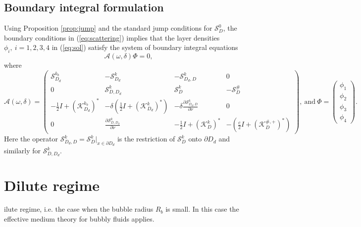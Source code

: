 \documentclass[a4paper]{article}
\theoremstyle{definition}
\newcommand{\A}{\mathcal{A}}
\renewcommand{\S}{\mathcal{S}}
\newcommand{\K}{\mathcal{K}}
\newcommand{\Scrystal}{\mathcal{S}_D^\#}
\newcommand{\eqnref}[1]{(\ref {#1})}
\begin{document}
\subsection{Boundary integral formulation}
Using Proposition \ref{prop:jump} and the standard jump conditions for $\S_D^0$, the boundary conditions in \eqnref{eq:scattering} implies that the layer densities $\phi_i,\ i=1,2,3,4$ in \eqnref{eq:sol} satisfy the system of boundary integral equations
\[\A(\omega, \delta)\Phi = 0,\] where
\begin{equation} \label{eq:A}
\A(\omega, \delta) = 
\begin{pmatrix}
\S_{D_d}^{k_b} &  -\S_{D_d}^{k} & -\S_{D_d,D}^{k} & 0 \\
0 & \S_{D,D_d}^k & \S_{D}^k & -\Scrystal \\
-\frac{1}{2}I+ (\K_{D_d}^{k_b})^*& -\delta\left( \frac{1}{2}I+ (\K_{D_d}^{k})^*\right) & -\delta \frac{\partial \S_{D_d,D}^{k}}{\partial \nu} & 0 \\
0 & \frac{\partial \S_{D,D_d}^{k}}{\partial \nu} & -\frac{1}{2}I+ (\K_D^{k})^* & -\left( \frac{c}{2}I+ \left(\K_D^{\#,+}\right)^*\right)
\end{pmatrix}, 
\ \text{and}  \ \Phi= 
\begin{pmatrix}
\phi_1\\
\phi_2 \\
\phi_3 \\
\phi_4
\end{pmatrix}.
\end{equation}
Here the operator $\S_{D_d,D}^{k} = \S_{D}^{k}|_{x\in \partial D_d}$ is the restriction of $\S_{D}^{k}$ onto $\partial D_d$ and similarly for $\S_{D,D_d}^{k}$.

\section{Dilute regime}
ilute regime, i.e. the case when the bubble radius $R_b$ is small. In this case the effective medium theory for bubbly fluids applies. \cite{effectivemedium}
\end{document}
